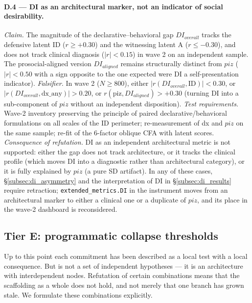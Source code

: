 \paragraph{D.4 --- DI as an architectural marker, not an indicator of social desirability.}
\emph{Claim.} The magnitude of the declarative--behavioral gap $DI_{overall}$ tracks the defensive latent ID ($r \geq +0.30$) and the witnessing latent A ($r \leq -0.30$), and does not track clinical diagnosis ($|r| < 0.15$) in wave 2 on an independent sample. The prosocial-aligned version $DI_{aligned}$ remains structurally distinct from $piz$ ($|r| < 0.50$ with a sign opposite to the one expected were DI a self-presentation indicator).
\emph{Falsifier.} In wave 2 ($N \geq 800$), either $|r(DI_{overall}, \text{ID})| < 0.30$, or $|r(DI_{overall}, \text{dx\_any})| > 0.20$, or $r(\text{piz}, DI_{aligned}) > +0.30$ (turning DI into a sub-component of $piz$ without an independent disposition).
\emph{Test requirements.} Wave-2 inventory preserving the principle of paired declarative/behavioral formulations on all scales of the ID perimeter; re-measurement of dx and $piz$ on the same sample; re-fit of the 6-factor oblique CFA with latent scores.
\emph{Consequence of refutation.} DI as an independent architectural metric is not supported: either the gap does not track architecture, or it tracks the clinical profile (which moves DI into a diagnostic rather than architectural category), or it is fully explained by $piz$ (a pure SD artifact). In any of these cases, §\ref{subsec:di_asymmetry} and the interpretation of DI in §\ref{subsec:di_results} require retraction; \texttt{extended\_metrics.DI} in the instrument moves from an architectural marker to either a clinical one or a duplicate of $piz$, and its place in the wave-2 dashboard is reconsidered.

\subsection{Tier E: programmatic collapse thresholds}
\label{subsec:collapse_thresholds}

Up to this point each commitment has been described as a local test with a local consequence. But \DEIC{} is not a set of independent hypotheses --- it is an architecture with interdependent nodes. Refutation of certain combinations means that the scaffolding as a whole does not hold, and not merely that one branch has grown stale. We formulate these combinations explicitly.

